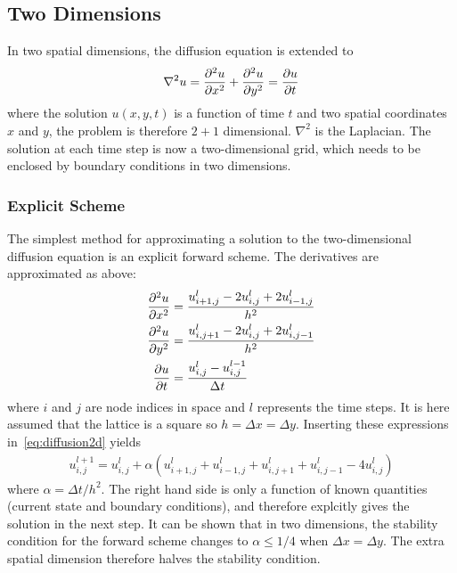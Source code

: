 \documentclass[aps,reprint]{revtex4-1}
\begin{document}
\subsection{Two Dimensions}
In two spatial dimensions, the diffusion equation is extended to
\begin{align} \label{eq:diffusion2d}
  \nabla^2 u = \pdv[2]{u}{x} + \pdv[2]{u}{y} = \pdv{u}{t}
\end{align}
where the solution $u(x,y,t)$ is a function of time $t$ and two spatial coordinates $x$ and $y$,
the problem is therefore $2 + 1$ dimensional. $\nabla^2$ is the Laplacian. The solution at
each time step is now a two-dimensional grid, which needs to be enclosed by boundary
conditions in two dimensions.
\subsubsection{Explicit Scheme}
The simplest method for approximating a solution to the two-dimensional diffusion
equation is an explicit forward scheme. The derivatives are approximated as above:
\begin{align*}
  \pdv[2]{u}{x} &= \frac{u^l_{i+1,j} - 2u^l_{i,j} + 2u^l_{i-1,j}}{h^2} \\
  \pdv[2]{u}{y} &= \frac{u^l_{i,j+1} - 2u^l_{i,j} + 2u^l_{i,j-1}}{h^2} \\
  \pdv{u}{t} &= \frac{u^l_{i,j} - u^{l-1}_{i,j}}{\Delta{t}}
\end{align*}
where $i$ and $j$ are node indices in space and $l$ represents the time steps. It
is here assumed that the lattice is a square so $h = \Delta{x} = \Delta{y}$. Inserting
these expressions in~\ref{eq:diffusion2d} yields
\begin{align*}
  u_{i,j}^{l+1} = u_{i,j}^l + \alpha (u^l_{i+1,j} + u^l_{i-1,j} + u_{i,j+1}^l + u_{i,j-1}^l - 4 u^l_{i,j})
\end{align*}
where $\alpha = \Delta{t}/h^2$. The right hand side is only a function of known
quantities (current state and boundary conditions), and therefore explcitly gives
the solution in the next step. It can be shown that in two dimensions, the stability condition
for the forward scheme changes to $\alpha \leq 1/4$ when $\Delta{x} = \Delta{y}$. The extra spatial dimension
therefore halves the stability condition.
\end{document}
